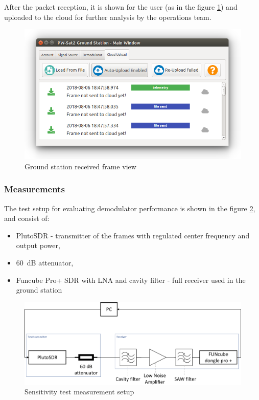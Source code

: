 After the packet reception, it is shown for the user (as in the figure \ref{gs_frame_view}) and uploaded to the cloud for further analysis by the operations team.

\begin{figure}[H]
    \centering
    \includegraphics[width=0.6\paperwidth]{img/7/gs_frame_view.png}
    \caption{Ground station received frame view}
    \label{gs_frame_view}
\end{figure}


\subsubsection{Measurements}
The test setup for evaluating demodulator performance is shown in the figure \ref{sensitivity_test_diagram}, and consist of:
\begin{itemize}
    \item PlutoSDR - transmitter of the frames with regulated center frequency and output power,
    \item \SI{60}{\dB} attenuator,
    \item Funcube Pro+ SDR with LNA and cavity filter - full receiver used in the ground station
\end{itemize}

\begin{figure}
    \centering
    \includegraphics[width=0.8\paperwidth]{img/7/sensitivity_test_diagram.pdf}
    \caption{Sensitivity test measurement setup}
    \label{sensitivity_test_diagram}
\end{figure}

